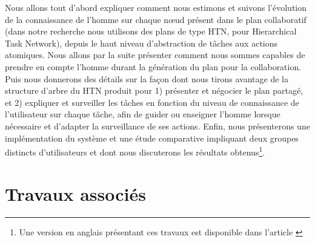 \documentclass[a4paper,11pt,twoside]{StyleThese}
\begin{document}
Nous allons tout d'abord expliquer comment nous estimons et suivons l'évolution de la connaissance de l'homme sur chaque nœud présent dans le plan collaboratif (dans notre recherche nous utilisons des plans de type HTN, pour Hierarchical Task Network), depuis le haut niveau d'abstraction de tâches aux actions atomiques. Nous allons par la suite présenter comment nous sommes capables de prendre en compte l'homme durant la génération du plan pour la collaboration. Puis nous donnerons des détails sur la façon dont nous tirons avantage de la structure d'arbre du HTN produit pour 1) présenter et négocier le plan partagé,
et 2) expliquer et surveiller les tâches en fonction du niveau de connaissance de l'utilisateur sur chaque tâche, afin de guider ou enseigner l'homme lorsque nécessaire et d'adapter la surveillance de ses actions. Enfin, nous présenterons une implémentation du système et une étude comparative impliquant deux groupes distincts d'utilisateurs et dont nous discuterons les résultats obtenus\footnote{Une version en anglais présentant ces travaux est disponible dans l'article \cite{Milliez16}}.





\section{Travaux associés}



\end{document}
